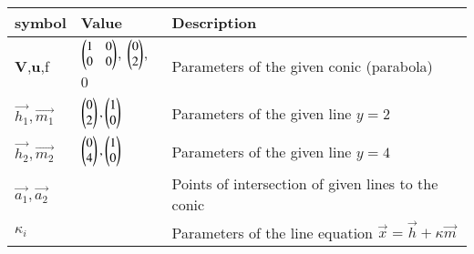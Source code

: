 \begin{tabular}{|m{5em} | m{7em} | m{10em} |}
    \hline
    \textbf{symbol} & \textbf{Value} & \textbf{Description}\\
    \hline
        \textbf{V},\textbf{u},f & $\begin{pmatrix} 1 & 0\\0 & 0\end{pmatrix}$, $\begin{pmatrix}0\\2\end{pmatrix}$, 0 & Parameters of the given conic (parabola)\\
    \hline
        $\vec{h_1}, \vec{m_1}$ & $\begin{pmatrix}0\\2\end{pmatrix}, \begin{pmatrix}1\\0\end{pmatrix}$ & Parameters of the given line $y = 2$\\
    \hline
        $\vec{h_2}, \vec{m_2}$ & $\begin{pmatrix}0\\4\end{pmatrix}, \begin{pmatrix}1\\0\end{pmatrix}$ & Parameters of the given line $y = 4$\\
    \hline
        $\vec{a_1}, \vec{a_2}$ & & Points of intersection of given lines to the conic\\
    \hline
        $\kappa_i$ & & Parameters of the line equation $\vec{x} = \vec{h} + \kappa\vec{m}$\\
    \hline
\end{tabular}
